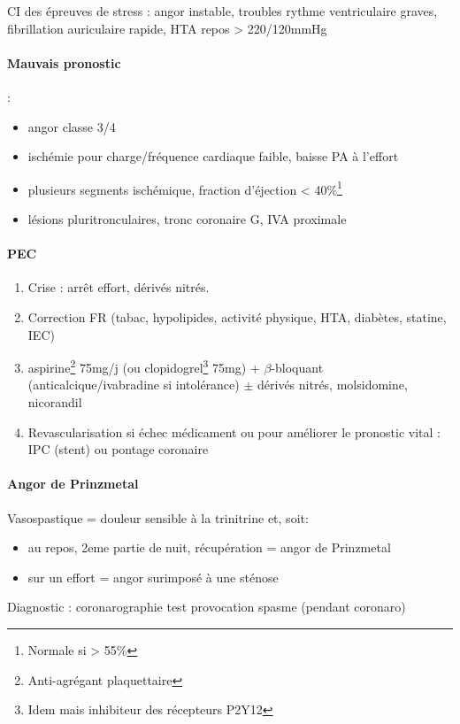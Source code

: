 \documentclass{article}
\begin{document}
\danger CI des épreuves de stress : angor instable, troubles rythme ventriculaire
graves, fibrillation auriculaire rapide, HTA repos > 220/120mmHg

\paragraph{Mauvais pronostic} : 
\begin{itemize}
  \item angor classe 3/4
  \item ischémie pour charge/fréquence cardiaque faible, baisse PA à l'effort
  \item plusieurs segments ischémique, fraction d'éjection <
    40\%\footnote{Normale si > 55\%}
  \item lésions pluritronculaires, tronc coronaire G, \gls{IVA} proximale
\end{itemize}

\paragraph{PEC}
\begin{enumerate}
\item Crise : arrêt effort, dérivés nitrés.
\item Correction FR (tabac, hypolipides, activité physique, HTA, diabètes, statine,
IEC)
\item aspirine\footnote{Anti-agrégant plaquettaire} 75mg/j (ou
  clopidogrel\footnote{Idem mais inhibiteur des récepteurs P2Y12} 75mg) +
  $\beta$-bloquant (anticalcique/ivabradine si intolérance) $\pm$ {dérivés nitrés, molsidomine,
nicorandil}
\item Revascularisation si échec médicament ou pour améliorer le pronostic vital
  : \gls{IPC} (stent) ou pontage coronaire
\end{enumerate}

\paragraph{Angor de Prinzmetal} Vasospastique = douleur sensible à la trinitrine
et, soit:
\begin{itemize}
  \item au repos, 2eme partie de nuit, récupération = angor de Prinzmetal
  \item sur un effort = angor surimposé à une sténose
\end{itemize}
Diagnostic : coronarographie \thus test provocation spasme (pendant coronaro)
\end{document}
